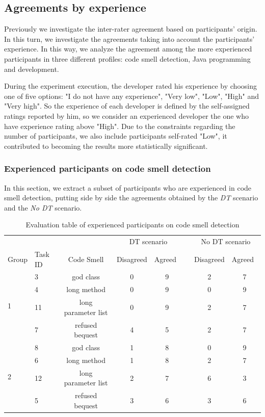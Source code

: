 \subsection{Agreements by experience} \label{sec:participantExperienceAgreement}

Previously we investigate the inter-rater agreement based on participants’ origin. In this turn, we investigate the agreements taking into account the participants’ experience. In this way, we analyze the agreement among the more experienced participants in three different profiles: code smell detection, Java programming and development.

During the experiment execution, the developer rated his experience by choosing one of five options: "I do not have any experience", "Very low", "Low", "High" and "Very high".  So the experience of each developer is defined by the self-assigned ratings reported by him, so we consider an experienced developer the one who have experience rating above "High". Due to the constraints regarding the number of participants, we also include participants self-rated "Low", it contributed to becoming the results more statistically significant. 

\subsubsection{Experienced participants on code smell detection} \label{sec:participantsCodeSmellDetecAgreement}    
In this section, we extract a subset of participants who are experienced in code smell detection, putting side by side the agreements obtained by the \textit{DT} scenario and the  \textit{No DT} scenario. 

\begin{table}[ht]
\centering
\begin{tabular}{llccclcc} 
\toprule
 &  & \multicolumn{1}{l}{} & \multicolumn{2}{c}{DT scenario} & \multicolumn{1}{c}{} & \multicolumn{2}{c}{No DT scenario} \\ 
\cmidrule{4-5}\cmidrule{7-8}
Group & Task ID & Code Smell & Disagreed & Agreed~ &  & \multicolumn{1}{l}{Disagreed} & \multicolumn{1}{l}{Agreed~} \\ 
\midrule
\multirow{4}{*}{1} & 3 & god class & 0 & 9 &  & 2 & 7 \\
 & 4 & long method & 0 & 9 &  & 0 & 9 \\
 & 11 & long parameter list & 0 & 9 &  & 2 & 7 \\
 & 7 & refused bequest & 4 & 5 &  & 2 & 7 \\ 
\midrule
\multirow{4}{*}{2} & 8 & god class & 1 & 8 &  & 0 & 9 \\
 & 6 & long method & 1 & 8 &  & 2 & 7 \\
 & 12 & long parameter list & 2 & 7 &  & 6 & 3 \\
 & 5 & refused bequest & 3 & 6 &  & 3 & 6 \\
\bottomrule
\end{tabular}
\caption{Evaluation table of experienced participants on code smell detection}
\label{tbl:codeSmellDetectionTableEvaluation}
\end{table}

